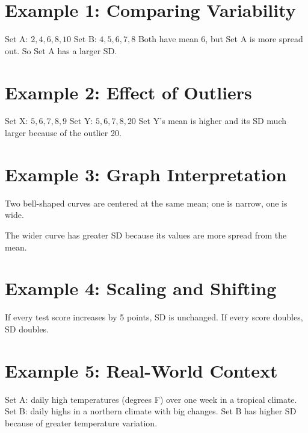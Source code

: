 \documentclass[14pt]{extarticle}
\begin{document}
\section*{Example 1: Comparing Variability}

Set A: \(2, 4, 6, 8, 10\)  
Set B: \(4, 5, 6, 7, 8\)  
Both have mean 6, but Set A is more spread out. So Set A has a larger SD.

\section*{Example 2: Effect of Outliers}

Set X: \(5, 6, 7, 8, 9\)  
Set Y: \(5, 6, 7, 8, 20\)  
Set Y’s mean is higher and its SD much larger because of the outlier 20.

\section*{Example 3: Graph Interpretation}

Two bell-shaped curves are centered at the same mean; one is narrow, one is wide.


The wider curve has greater SD because its values are more spread from the mean.

\section*{Example 4: Scaling and Shifting}

If every test score increases by 5 points, SD is unchanged.  
If every score doubles, SD doubles.

\section*{Example 5: Real-World Context}

Set A: daily high temperatures (degrees F) over one week in a tropical climate.  
Set B: daily highs in a northern climate with big changes.  
Set B has higher SD because of greater temperature variation.
\end{document}
